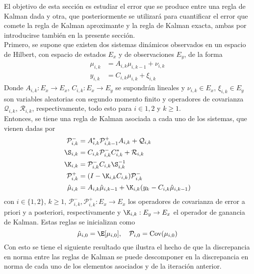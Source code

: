 El objetivo de esta sección es estudiar el error que se produce entre una regla de Kalman dada y otra, que posteriormente se utilizará para cuantificar el error que comete la regla de Kalman aproximante y la regla de Kalman exacta, ambas por introducirse también en la presente sección. \\
Primero, se supone que existen dos sistemas dinámicos observados en un espacio de Hilbert, con espacio de estados $E_x$ y de observaciones $E_y$, de la forma
\begin{equation*}
	\begin{aligned}
		\mu_{i,k}  &= A_{i,k} \mu_{i,k-1} + \nu_{i,k} \\
		y_{i,k} &= C_{i,k} \mu_{i,k} + \xi_{i, k}
	\end{aligned}
\end{equation*}
Donde $A_{i,k} : E_x \to E_x$, $C_{i,k}: E_x \to E_y$ se supondrán lineales y $\nu_{i,k} \in E_x$, $\xi_{i,k} \in E_y$ son variables aleatorias con segundo momento finito y operadores de covarianza $\mathcal{Q}_{i,k}$, $\mathcal{R}_{i,k}$, respectivamente, todo esto para $i \in {1,2}$ y $k \geq 1$. \\
Entonces, se tiene una regla de Kalman asociada a cada uno de los sistemas, que vienen dadas por
\begin{equation*}
	\begin{aligned}
		\mathcal{P}_{i,k}^- &= A_{i,k}^* \mathcal{P}_{i,k-1}^+ A_{i,k} + \mathcal{Q}_{i,k} \\
		\S_{i,k} &= C_{i,k} \mathcal{P}_{i,k}^- C_{i,k}^* + \mathcal{R}_{i,k} \\
		\K_{i,k} &= \mathcal{P}_{i,k}^- C_{i,k}\S_{i,k}^{-1} \\
		\mathcal{P}_{i,k}^+  &= (I - \K_{i,k} C_{i,k}) \mathcal{P}_{i,k}^- \\
		\hat{\mu}_{i,k} &= A_{i,k} \hat \mu_{i,k-1} + \K_{i,k} (y_{k} - C_{i,k} \hat\mu_{i,k-1}) 
	\end{aligned}
\end{equation*}
con $i \in \{ 1,2 \}$, $k \geq 1$, $\mathcal{P}_{i,k}^-, \mathcal{P}_{i,k}^+ : E_x \to E_x$ los operadores de covarianza de error a priori y a posteriori, respectivamente y $\K_{i,k} : E_y \to E_x$ el operador de ganancia de Kalman. Estas reglas se inicializan como
\begin{equation*}
	\hat{\mu}_{i,0} = \E [\mu_{i,0}], \quad \mathcal{P}_{i,0} = \text{Cov} ( \mu_{i,0})
\end{equation*}
Con esto se tiene el siguiente resultado que ilustra el hecho de que la discrepancia en norma entre las reglas de Kalman se puede descomponer en la discrepancia en norma de cada uno de los elementos asociados y de la iteración anterior.

